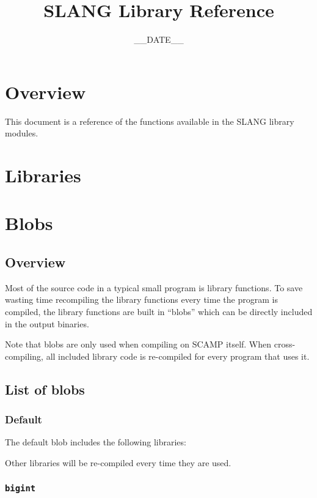 \documentclass[twocolumn]{article}
\title{SLANG Library Reference}
\date{__DATE__}
\begin{document}
\maketitle
\tableofcontents
\newpage

\section{Overview}

This document is a reference of the functions available in the SLANG library modules.

\section{Libraries}



\section{Blobs}

\subsection{Overview}

Most of the source code in a typical small program is library functions. To save
wasting time recompiling the library functions every time the program is
compiled, the library
functions are built in ``blobs'' which can be directly included in the output binaries.

Note that blobs are only used when compiling on SCAMP itself. When cross-compiling, all
included library code is re-compiled for every program that uses it.

\subsection{List of blobs}

\subsubsection{Default}

The default blob includes the following libraries:



Other libraries will be re-compiled every time they are used.

\subsubsection{\texttt{bigint}}
\end{document}
